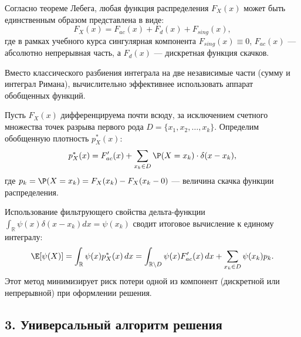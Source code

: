 Согласно теореме Лебега, любая функция распределения $F_X(x)$ может быть единственным образом представлена в виде:
\[
    F_X(x) = F_{ac}(x) + F_d(x) + F_{sing}(x),
\]
где в рамках учебного курса сингулярная компонента $F_{sing}(x) \equiv 0$, $F_{ac}(x)$ — абсолютно непрерывная часть, а $F_d(x)$ — дискретная функция скачков.

Вместо классического разбиения интеграла на две независимые части (сумму и интеграл Римана), вычислительно эффективнее использовать аппарат обобщенных функций.

\begin{HackBox}
Пусть $F_X(x)$ дифференцируема почти всюду, за исключением счетного множества точек разрыва первого рода $D = \{x_1, x_2, \dots, x_k\}$. 
Определим обобщенную плотность $p^*_X(x)$:
\[
    p^*_X(x) = F_{ac}'(x) + \sum_{x_k \in D} \P(X = x_k) \cdot \delta(x - x_k),
\]
где $p_k = \P(X = x_k) = F_X(x_k) - F_X(x_k - 0)$ — величина скачка функции распределения.

Использование фильтрующего свойства дельта-функции $\int_{\mathbb{R}} \psi(x)\delta(x - x_k)dx = \psi(x_k)$ сводит итоговое вычисление к единому интегралу:
\[
    \E[\psi(X)] = \int_{\mathbb{R}} \psi(x) p^*_X(x) \, dx = \int_{\mathbb{R} \setminus D} \psi(x) F_{ac}'(x) \, dx + \sum_{x_k \in D} \psi(x_k) p_k.
\]
Этот метод минимизирует риск потери одной из компонент (дискретной или непрерывной) при оформлении решения.
\end{HackBox}

\subsection*{3. Универсальный алгоритм решения}


